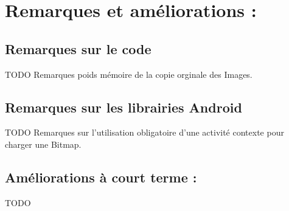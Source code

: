 \section{Remarques et améliorations  :}

\subsection{Remarques sur le code}
TODO Remarques poids mémoire de la copie orginale des Images.

\subsection{Remarques sur les librairies Android}
TODO Remarques sur l'utilisation obligatoire d'une activité contexte pour charger une Bitmap.

\subsection{Améliorations à court terme :}
TODO